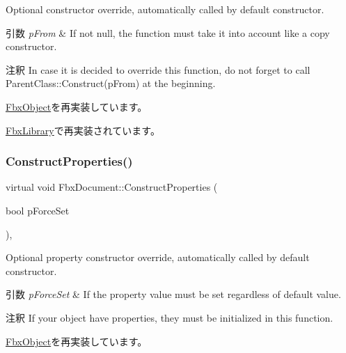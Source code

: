 Optional constructor override, automatically called by default constructor. 
\begin{DoxyParams}{引数}
{\em p\+From} & If not null, the function must take it into account like a copy constructor. \\
\hline
\end{DoxyParams}
\begin{DoxyRemark}{注釈}
In case it is decided to override this function, do not forget to call Parent\+Class\+::\+Construct(p\+From) at the beginning. 
\end{DoxyRemark}


\hyperlink{class_fbx_object_a313503bc645af3fdceb4a99ef5cea7eb}{Fbx\+Object}を再実装しています。



\hyperlink{class_fbx_library_a8e9fbf97f6753d859411f284db16f964}{Fbx\+Library}で再実装されています。

\mbox{\label{class_fbx_document_a10a4a36c6d252d72036abc1f9d02aeee}} 
\subsubsection{\texorpdfstring{Construct\+Properties()}{ConstructProperties()}}
{\footnotesize\ttfamily virtual void Fbx\+Document\+::\+Construct\+Properties (\begin{DoxyParamCaption}\item[{bool}]{p\+Force\+Set }\end{DoxyParamCaption})\hspace{0.3cm}{\ttfamily [protected]}, {\ttfamily [virtual]}}

Optional property constructor override, automatically called by default constructor. 
\begin{DoxyParams}{引数}
{\em p\+Force\+Set} & If the property value must be set regardless of default value. \\
\hline
\end{DoxyParams}
\begin{DoxyRemark}{注釈}
If your object have properties, they must be initialized in this function. 
\end{DoxyRemark}


\hyperlink{class_fbx_object_ad44f814323dc1b5e78bff1bfc608b4bb}{Fbx\+Object}を再実装しています。

